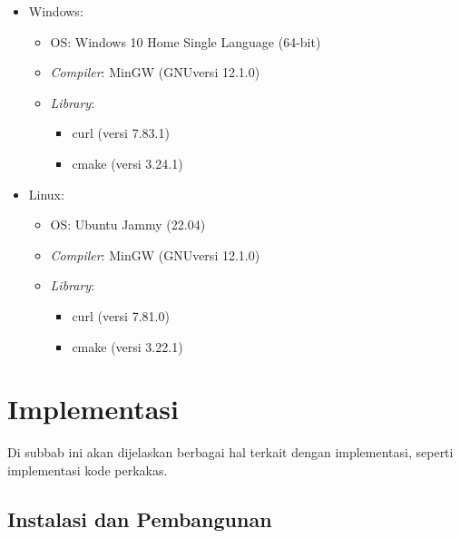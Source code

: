\begin{itemize}
	\item Windows:
	
	\begin{itemize}
		\item OS: Windows 10 Home Single Language (64-bit)
		\item \textit{Compiler}: MinGW (GNU\textemdash versi 12.1.0)
		\item \textit{Library}:
		
		\begin{itemize}
			\item curl (versi 7.83.1)
			\item cmake (versi 3.24.1)
		\end{itemize}
		
	\end{itemize}
	
	\item Linux:
	
	\begin{itemize}
		\item OS: Ubuntu Jammy (22.04)
		\item \textit{Compiler}: MinGW (GNU\textemdash versi 12.1.0)
		\item \textit{Library}:
		
		\begin{itemize}
			\item curl (versi 7.81.0)
			\item cmake (versi 3.22.1)
		\end{itemize}
		
	\end{itemize}
	
\end{itemize}

\section{Implementasi}
\label{sec:testing-implementation}

Di subbab ini akan dijelaskan berbagai hal terkait dengan implementasi, seperti implementasi kode perkakas. 

\subsection{Instalasi dan Pembangunan}
\label{sec:testing-implementation-usage}

